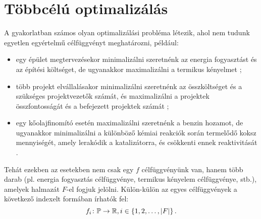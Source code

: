 \section{Többcélú optimalizálás}
A gyakorlatban számos olyan optimalizálási probléma létezik, ahol nem tudunk egyetlen egyértelmű célfüggvényt meghatározni, például:
\begin{itemize}
  \item[\textbullet] egy épület megtervezésekor minimalizálni szeretnénk az energia fogyasztást és az építési költséget, de ugyanakkor maximalizálni a termikus kényelmet \cite{nguyen2014review};
  \item[\textbullet] több projekt elvállalásakor minimalizálni szeretnénk az összköltséget és a szükséges projektvezetők számát, és maximalizálni a projektek összfontosságát és a befejezett projektek számát \cite{alothaimeen2019overview};
  \item[\textbullet] egy kőolajfinomító esetén maximalizálni szeretnénk a benzin hozamot, de ugyanakkor minimalizálni a különböző kémiai reakciók során termelődő koksz mennyiségét, amely lerakódik a katalizátorra, és csökkenti ennek reaktivitását \cite{kasat2003multi}.
\end{itemize}

Tehát ezekben az esetekben nem csak egy $f$ célfüggvényünk van, hanem több darab (pl. energia fogyasztás célfüggvénye, termikus kényelem célfüggvénye, stb.), amelyek halmazát $F$-el fogjuk jelölni.
Külön-külön az egyes célfüggvények a következő indexelt formában írhatók fel:
\begin{equation}\label{eqn:OBJECTIVE_FUNCTIONS}
  f_i \colon \mathbb{P} \to \mathbb{R}, i \in \left\{ 1, 2, \dots, \lvert F\rvert \right\}.
\end{equation}
